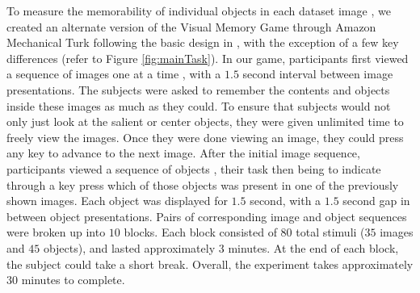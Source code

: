 To measure the memorability of individual objects in each dataset image , we created an alternate version of the Visual Memory Game through Amazon Mechanical Turk following the basic design in \cite{isola11}, with the exception of a few key differences (refer to Figure \ref{fig:mainTask}). In our game, participants first viewed a sequence of images one at a time , with a $1.5$ second interval between image presentations. The subjects were asked to remember the contents and objects inside these images as much as they could. To ensure that subjects would not only just  look at the salient or center objects, they were given unlimited time to freely view the images. Once they were done viewing an image, they could press any key to advance to the next image. After the initial image sequence, participants viewed a sequence of objects , their task then being to indicate through a key press which of those objects was present in one of the previously shown images. Each object was displayed for $1.5$ second, with a $1.5$ second gap in between object presentations. Pairs of corresponding image and object sequences were broken up into $10$ blocks. Each block consisted of $80$ total stimuli ($35$ images and $45$ objects), and lasted approximately $3$ minutes. At the end of each block, the subject could take a short break. Overall, the experiment takes approximately $30$ minutes to complete.

